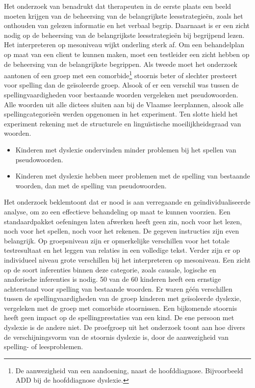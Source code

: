 Het onderzoek van \textcite{VanVreckem2015} benadrukt dat therapeuten in de eerste plaats een beeld moeten krijgen van de beheersing van de belangrijkste leesstrategieën, zoals het onthouden van gelezen informatie en het verbaal begrip. Daarnaast is er een zicht nodig op de beheersing van de belangrijkste leesstrategieën bij begrijpend lezen. Het interpreteren op mesoniveau wijkt onderling sterk af. Om een behandelplan op maat van een client te  kunnen maken, moet een testleider een zicht hebben op de beheersing van de belangrijkste begrippen. Als tweede moet het onderzoek aantonen of een groep met een comorbide\footnote{De aanwezigheid van een aandoening, naast de hoofddiagnose. Bijvoorbeeld ADD bij de hoofddiagnose dyslexie. } stoornis beter of slechter presteert voor spelling dan de geïsoleerde groep. Alsook of er een verschil was tussen de spellingvaardigheden voor bestaande woorden vergeleken met pseudowoorden. Alle woorden uit alle dictees sluiten aan bij de Vlaamse leerplannen, alsook alle spellingcategorieën werden opgenomen in het experiment. Ten slotte hield het experiment rekening met de structurele en linguïstische moeilijkheidsgraad van woorden.

\begin{itemize}
	\item Kinderen met dyslexie ondervinden minder problemen bij het spellen van pseudowoorden.
	\item Kinderen met dyslexie hebben meer problemen met de spelling van bestaande woorden, dan met de spelling van pseudowoorden.
\end{itemize}

Het onderzoek beklemtoont dat er nood is aan verregaande en geïndividualiseerde analyse, om zo een effectieve behandeling op maat te kunnen voorzien. Een standaardpakket oefeningen laten afwerken heeft geen zin, noch voor het lezen, noch voor het spellen, noch voor het rekenen. De gegeven instructies zijn even belangrijk. Op groepsniveau zijn er opmerkelijke verschillen voor het totale testresultaat en het leggen van relaties in een volledige tekst. Verder zijn er op individueel niveau grote verschillen bij het interpreteren op mesoniveau. Een zicht op de soort inferenties binnen deze categorie, zoals causale, logische en anaforische inferenties is nodig. 50 van de 60 kinderen heeft een ernstige achterstand voor spelling van bestaande woorden. Er waren géén verschillen tussen de spellingvaardigheden van de groep kinderen met geïsoleerde dyslexie, vergeleken met de groep met comorbide stoornissen. Een bijkomende stoornis heeft geen impact op de spellingprestaties van een kind. De ene persoon met dyslexie is de andere niet. De proefgroep uit het onderzoek toont aan hoe divers de verschijningsvorm van de stoornis dyslexie is, door de aanwezigheid van spelling- of leesproblemen.


